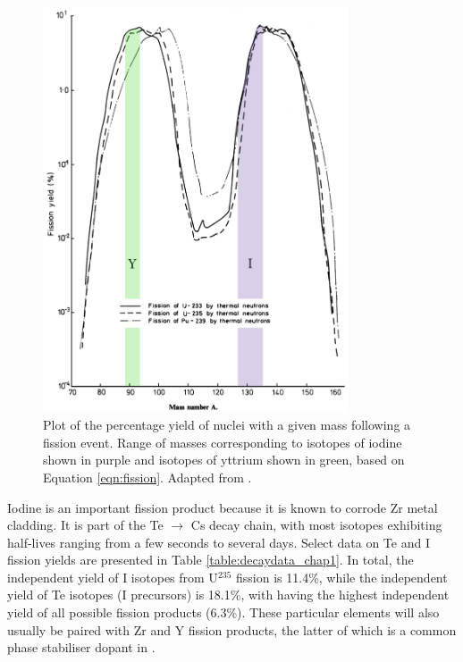 
\begin{figure}[ht]
\centering
\includegraphics[height=12cm]{images/fissionyield.jpg}
\caption[Plot of the percentage yield of nuclei with a given mass following a fission event. Range of masses corresponding to isotopes of iodine shown in purple and isotopes of yttrium shown in green, based on Equation \ref{eqn:fission}.]{Plot of the percentage yield of nuclei with a given mass following a fission event. Range of masses corresponding to isotopes of iodine shown in purple and isotopes of yttrium shown in green, based on Equation \ref{eqn:fission}. Adapted from \cite{England1992}.}
\label{figure:fissionyield}
\end{figure}

Iodine is an important fission product because it is known to corrode Zr metal cladding. It is part of the Te $\rightarrow$ Cs decay chain, with most isotopes exhibiting half-lives ranging from a few seconds to several days. Select data on Te and I fission yields are presented in Table \ref{table:decaydata_chap1}. In total, the independent yield of I isotopes from U$^{235}$ fission is 11.4\%, while the independent yield of Te isotopes (I precursors) is 18.1\%, with  having the highest independent yield of all possible fission products (6.3\%). These particular elements will also usually be paired with Zr and Y fission products, the latter of which is a common phase stabiliser dopant in \zirconia .


